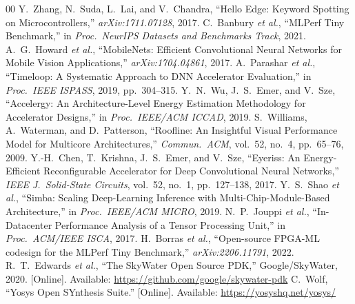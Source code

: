 \documentclass[conference]{IEEEtran}
\begin{document}
\begin{thebibliography}{00}
 Y.~Zhang, N.~Suda, L.~Lai, and V.~Chandra, ``Hello Edge:
Keyword Spotting on Microcontrollers,'' \emph{arXiv:1711.07128}, 2017.
 C.~Banbury \emph{et al.}, ``MLPerf Tiny Benchmark,'' in
\emph{Proc.\ NeurIPS Datasets and Benchmarks Track}, 2021.
 A.~G.~Howard \emph{et al.}, ``MobileNets: Efficient
Convolutional Neural Networks for Mobile Vision Applications,''
\emph{arXiv:1704.04861}, 2017.
 A.~Parashar \emph{et al.}, ``Timeloop: A Systematic Approach
to DNN Accelerator Evaluation,'' in \emph{Proc.\ IEEE ISPASS}, 2019, pp.\
304--315.
 Y.~N.~Wu, J.~S.~Emer, and V.~Sze, ``Accelergy: An
Architecture-Level Energy Estimation Methodology for Accelerator Designs,'' in
\emph{Proc.\ IEEE/ACM ICCAD}, 2019.
 S.~Williams, A.~Waterman, and D.~Patterson, ``Roofline: An
Insightful Visual Performance Model for Multicore Architectures,''
\emph{Commun.\ ACM}, vol.\ 52, no.\ 4, pp.\ 65--76, 2009.
 Y.-H.~Chen, T.~Krishna, J.~S.~Emer, and V.~Sze, ``Eyeriss: An
Energy-Efficient Reconfigurable Accelerator for Deep Convolutional Neural
Networks,'' \emph{IEEE J.\ Solid-State Circuits}, vol.\ 52, no.\ 1, pp.\
127--138, 2017.
\bibitem{simba} Y.~S.~Shao \emph{et al.}, ``Simba: Scaling Deep-Learning
Inference with Multi-Chip-Module-Based Architecture,'' in \emph{Proc.\ IEEE/ACM
MICRO}, 2019.
\bibitem{tpu} N.~P.~Jouppi \emph{et al.}, ``In-Datacenter Performance Analysis of
a Tensor Processing Unit,'' in \emph{Proc.\ ACM/IEEE ISCA}, 2017.
\bibitem{fpgacodesign} H.~Borras \emph{et al.}, ``Open-source FPGA-ML codesign
for the MLPerf Tiny Benchmark,'' \emph{arXiv:2206.11791}, 2022.
\bibitem{sky130} R.~T.~Edwards \emph{et al.}, ``The SkyWater Open Source PDK,''
Google/SkyWater, 2020. [Online]. Available: \url{https://github.com/google/skywater-pdk}
\bibitem{yosys} C.~Wolf, ``Yosys Open SYnthesis Suite.'' [Online]. Available:
\url{https://yosyshq.net/yosys/}
\end{thebibliography}
\end{document}
